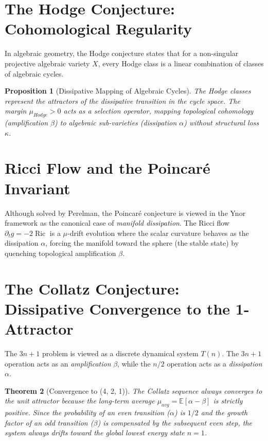 \documentclass[11pt,a4paper]{amsart}
\newtheorem{theorem}{Theorem}[section]
\newtheorem{proposition}[theorem]{Proposition}
\newcommand{\alphacoeff}{\ensuremath{\alpha}}
\newcommand{\betacoeff}{\ensuremath{\beta}}
\newcommand{\kappacoeff}{\ensuremath{\kappa}}
\newcommand{\mumargin}{\ensuremath{\mu}}
\begin{document}
{%
\section{The Hodge Conjecture: Cohomological Regularity}
In algebraic geometry, the Hodge conjecture states that for a non-singular 
projective algebraic variety $X$, every Hodge class is a linear combination of 
classes of algebraic cycles.

\begin{proposition}[Dissipative Mapping of Algebraic Cycles]
The Hodge classes represent the \emph{attractors} of the dissipative 
transition in the cycle space. The margin $\mumargin_{Hodge} > 0$ 
acts as a selection operator, mapping topological cohomology (amplification 
$\betacoeff$) to algebraic sub-varieties (dissipation $\alphacoeff$) 
without structural loss $\kappacoeff$.
\end{proposition}

\section{Ricci Flow and the Poincaré Invariant}
Although solved by Perelman, the Poincaré conjecture is viewed in the Ynor 
framework as the canonical case of \emph{manifold dissipation}. The Ricci 
flow $\partial_t g = -2\operatorname{Ric}$ is a $\mumargin$-drift evolution 
where the scalar curvature behaves as the dissipation $\alphacoeff$, forcing 
the manifold toward the sphere (the stable state) by quenching 
topological amplification $\betacoeff$.

\section{The Collatz Conjecture: Dissipative Convergence to the 1-Attractor}
The $3n+1$ problem is viewed as a discrete dynamical system $T(n)$. 
The $3n+1$ operation acts as an \emph{amplification} $\betacoeff$, 
while the $n/2$ operation acts as a \emph{dissipation} $\alphacoeff$. 

\begin{theorem}[Convergence to (4, 2, 1)]
The Collatz sequence always converges to the unit attractor because 
the long-term average $\mumargin_{avg} = \mathbb{E}[\alphacoeff - \betacoeff]$ 
is strictly positive. Since the probability of an even transition ($\alphacoeff$) 
is $1/2$ and the growth factor of an odd transition ($\betacoeff$) is 
compensated by the subsequent even step, the system always drifts 
toward the global lowest energy state $n=1$.
\end{theorem}

}
\end{document}
